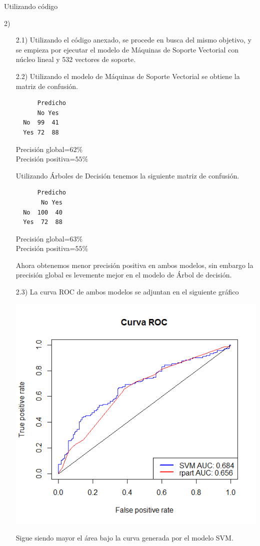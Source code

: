 \documentclass[11pt,a4paper]{report}
\begin{document}
\begin{center}
Utilizando código
\end{center}
2)
\begin{itemize}
\item[2.1)] Utilizando el código anexado, se procede en busca del mismo objetivo, y se empieza por
ejecutar el modelo de Máquinas de Soporte Vectorial con núcleo lineal y 532 vectores de soporte.

\item[2.2)] Utilizando el modelo de Máquinas de Soporte Vectorial se obtiene  la matriz de confusión.
\begin{verbatim}
      Predicho
      No Yes
  No  99  41
  Yes 72  88
\end{verbatim}
Precisión global=$62\%$\\
Precisión positiva=$55\%$

Utilizando Árboles de Decisión tenemos la siguiente matriz de confusión.
\begin{verbatim}
      Predicho
       No Yes
  No  100  40
  Yes  72  88
\end{verbatim}
Precisión global=$63\%$\\
Precisión positiva=$55\%$

Ahora obtenemos menor precisión positiva en ambos modelos, sin embargo la precisión global es levemente mejor en el modelo de Árbol de decisión.
\item[2.3)]La curva ROC de ambos modelos se adjuntan en el siguiente gráfico
\begin{center}
\includegraphics[scale=0.6]{ROCr.png}
\end{center}
Sigue siendo mayor  el área bajo la curva generada por el modelo SVM.

\end{itemize}
\end{document}
